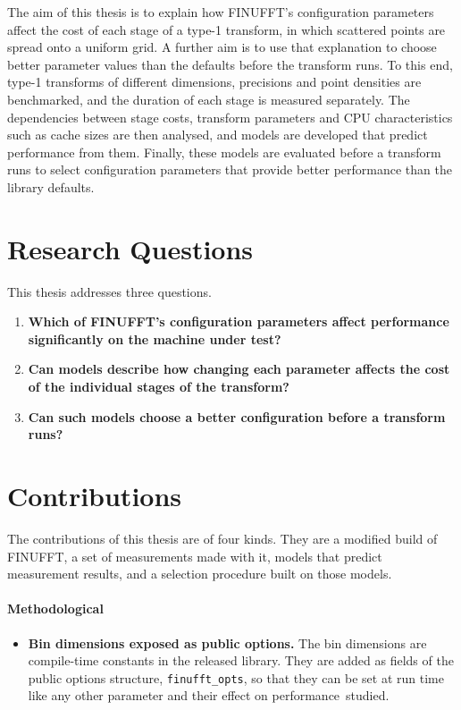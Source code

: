 The aim of this thesis is to explain how FINUFFT's configuration parameters
affect the cost of each stage of a type-1 transform, in which scattered points
are spread onto a uniform grid. A further aim is to use that explanation to
choose better parameter values than the defaults before the transform runs. To
this end, type-1 transforms of different dimensions, precisions and point
densities are benchmarked, and the duration of each stage is measured
separately. The dependencies between stage costs, transform parameters and CPU
characteristics such as cache sizes are then analysed, and models are developed
that predict performance from them. Finally, these models are evaluated before
a transform runs to select configuration parameters that provide better
performance than the library defaults.


\section{Research Questions}
\label{sec:research_questions}

This thesis addresses three questions.

\begin{enumerate}
    \item \textbf{Which of FINUFFT's configuration parameters affect performance
    significantly on the machine under test?}
    \item \textbf{Can models describe how changing each parameter affects the
    cost of the individual stages of the transform?} 
    \item \textbf{Can such models choose a better configuration before a
    transform runs?} 
\end{enumerate}

\section{Contributions}

The contributions of this thesis are of four kinds. They are a modified build
of FINUFFT, a set of measurements made with it, models that predict
measurement results, and a selection procedure built on those models.

\paragraph{Methodological}
\begin{itemize}
    \item \textbf{Bin dimensions exposed as public options.} The bin dimensions
    are compile-time constants in the released library. They are added as fields
    of the public options structure, \texttt{finufft\_opts}, so that they can be
    set at run time like any other parameter and their effect on performance~\mbox{studied}.
\end{itemize}

